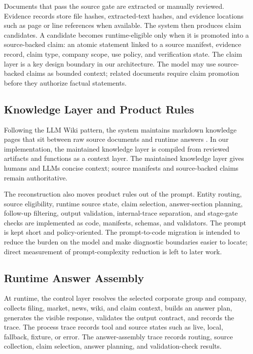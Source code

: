 Documents that pass the source gate are extracted or manually reviewed. Evidence records store file hashes, extracted-text hashes, and evidence locations such as page or line references when available. The system then produces claim candidates. A candidate becomes runtime-eligible only when it is promoted into a source-backed claim: an atomic statement linked to a source manifest, evidence record, claim type, company scope, use policy, and verification state. The claim layer is a key design boundary in our architecture. The model may use source-backed claims as bounded context; related documents require claim promotion before they authorize factual statements.

\subsection{Knowledge Layer and Product Rules}

Following the LLM Wiki pattern, the system maintains markdown knowledge pages that sit between raw source documents and runtime answers \citep{karpathy2026llmwiki}. In our implementation, the maintained knowledge layer is compiled from reviewed artifacts and functions as a context layer. The maintained knowledge layer gives humans and LLMs concise context; source manifests and source-backed claims remain authoritative.

The reconstruction also moves product rules out of the prompt. Entity routing, source eligibility, runtime source state, claim selection, answer-section planning, follow-up filtering, output validation, internal-trace separation, and stage-gate checks are implemented as code, manifests, schemas, and validators. The prompt is kept short and policy-oriented. The prompt-to-code migration is intended to reduce the burden on the model and make diagnostic boundaries easier to locate; direct measurement of prompt-complexity reduction is left to later work.

\subsection{Runtime Answer Assembly}

At runtime, the control layer resolves the selected corporate group and company, collects filing, market, news, wiki, and claim context, builds an answer plan, generates the visible response, validates the output contract, and records the trace. The process trace records tool and source states such as live, local, fallback, fixture, or error. The answer-assembly trace records routing, source collection, claim selection, answer planning, and validation-check results.

